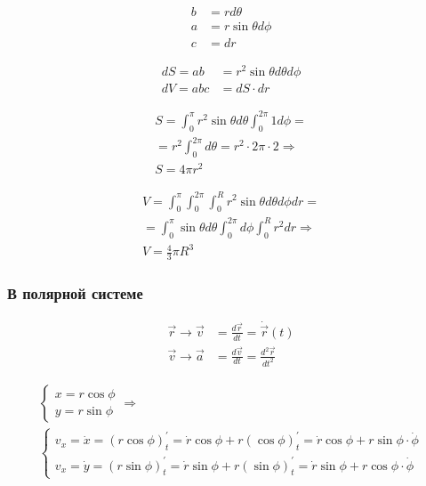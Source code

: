 \documentclass{article}
\begin{document}
\begin{align*}
	b &= r d\theta \\
	a &= r \sin \theta d\phi \\
	c &= dr
\end{align*}

\begin{align*}
	dS = ab &= r^2 \sin \theta d\theta d\phi \\
	dV = abc &= dS \cdot dr
\end{align*}

\begin{gather*}
	S = \int_{0}^{\pi} r^2 \sin \theta d\theta  \int_{0}^{2\pi} 1 d\phi = \\
	= r^2 \int_{0}^{2\pi} d\theta = r^2 \cdot 2\pi \cdot 2 \Rightarrow \\
	S = 4 \pi r^2
\end{gather*}

\begin{gather*}
	V = \int_{0}^{\pi} \int_{0}^{2\pi} \int_{0}^{R} r^2 \sin \theta d\theta d\phi dr = \\
	= \int_{0}^{\pi} \sin \theta d\theta \int_{0}^{2\pi} d\phi \int_{0}^{R} r^2 dr \Rightarrow \\
	V = \frac{4}{3} \pi R^3
\end{gather*}

\subsubsection*{В полярной системе}

\begin{align*}
	\vec{r} \rightarrow \vec{v} &= \frac{d\vec{r}}{dt} = \dot{\vec{r}}(t) \\
	\vec{v} \rightarrow \vec{a} &= \frac{d\vec{v}}{dt} = \frac{d^2\vec{r}}{dt^2}
\end{align*}

\begin{gather*}
	\begin{cases}
		x = r \cos \phi \\
		y = r \sin \phi
	\end{cases} \Rightarrow \\
	\begin{cases}
		v_x = \dot{x} = (r \cos \phi)_{t}^{'} = \dot{r} \cos \phi + r(\cos \phi)_{t}^{'} = 
		\dot{r} \cos \phi + r \sin \phi \cdot \dot{\phi} \\
		v_x = \dot{y} = (r \sin \phi)_{t}^{'} = \dot{r} \sin \phi + r(\sin \phi)_{t}^{'} =
		\dot{r} \sin \phi + r \cos \phi \cdot \dot{\phi}
	\end{cases}
\end{gather*}
\end{document}
